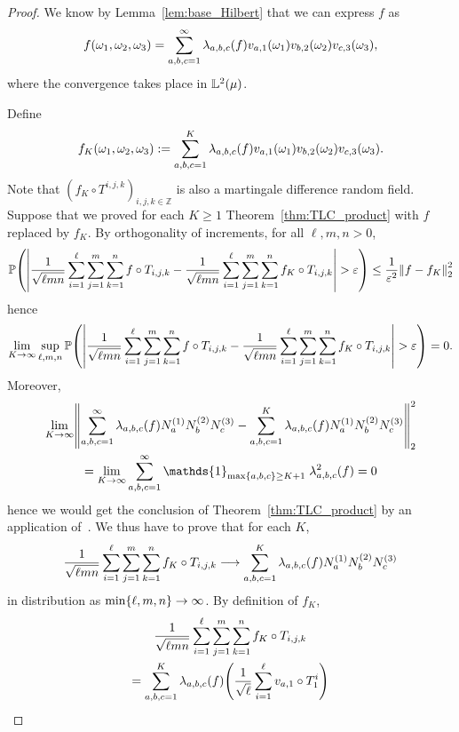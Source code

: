 \documentclass[AHL,Unicode,longabstracts,published]{cedram}
\newcommand{\Z}{\mathbb{Z}}
\newcommand*\bbL{\mathbb{L}}
\newcommand{\PP}{\mathbb{P}}
\newcommand{\pr}[1]{\left(#1\right)}
\newcommand{\norm}[1]{\left\lVert #1\right\rVert}
\newcommand{\abs}[1]{\left\lvert #1\right\rvert}
\newcommand{\ens}[1]{\left\{#1\right\}}
\renewcommand*{\to}{\mathchoice{\longrightarrow}{\rightarrow}{\rightarrow}{\rightarrow}}
\let\originalleft\left
\let\originalright\right
\renewcommand{\left}{\mathopen{}\mathclose\bgroup\originalleft}
\renewcommand{\right}{\aftergroup\egroup\originalright}
\begin{document}
\begin{proof}
We know by Lemma~\ref{lem:base_Hilbert} that we can express $f$ as
\[
f(\omega_1,\omega_2,\omega_3)=\sum_{a,b,c=1}^\infty
\lambda_{a,b,c}\pr{f}
v_{a,1}\pr{\omega_1}v_{b,2}\pr{\omega_2}v_{c,3}\pr{\omega_3},
\]
where the convergence takes place in $\bbL^2\pr{\mu}$.

Define
\begin{equation*}
f_K\pr{\omega_1,\omega_2,\omega_3}:=\sum_{a,b,c=1}^K
\lambda_{a,b,c}\pr{f} v_{a,1}\pr{\omega_1}v_{b,2}\pr{\omega_2}v_{c,3}\pr{\omega_3}.
\end{equation*}
Note that $(f_K\circ T^{i,j,k})_{i,j,k\in\Z}$ is also a martingale difference random field. Suppose that we proved for each $K\geq 1$ Theorem~\ref{thm:TLC_product} with $f$ replaced by $f_K$. By orthogonality of increments, for all $\ell, m, n>0$,
\[
\PP\pr{\abs{\frac1{\sqrt{\ell mn}}\sum_{i=1}^\ell\sum_{j=1}^m\sum_{k=1}^n f\circ T_{i,j,k}-\frac1{\sqrt{\ell mn}}\sum_{i=1}^\ell\sum_{j=1}^m\sum_{k=1}^n f_K\circ T_{i,j,k}}>\varepsilon}
\leq\frac 1{\varepsilon^2}\norm{f-f_K}_2^2
\]
hence
\[
\lim_{K\to\infty}\sup_{\ell,m,n}
\PP\pr{\abs{\frac1{\sqrt{\ell mn}}\sum_{i=1}^\ell\sum_{j=1}^m\sum_{k=1}^n f\circ T_{i,j,k}-\frac1{\sqrt{\ell mn}}\sum_{i=1}^\ell\sum_{j=1}^m\sum_{k=1}^n f_K\circ T_{i,j,k}}>\varepsilon}=0.
\]
Moreover,
\begin{multline*}
\lim_{K\to\infty}\norm{\sum_{a,b,c=1}^\infty \lambda_{a,b,c}\pr{f} N_a^{\pr{1}}N_b^{\pr{2}}N_c^{\pr{3}}-\sum_{a,b,c=1}^K
\lambda_{a,b,c}\pr{f} N_a^{\pr{1}}N_b^{\pr{2}}N_c^{\pr{3}}}_2^2\\ =
\lim_{K\to\infty} \sum_{a,b,c=1}^\infty
\mathds{1}_{\max\ens{a,b,c}\geq K+1 }\;
\lambda_{a,b,c}^2\pr{f}=0
\end{multline*}
hence we would get the conclusion of Theorem~\ref{thm:TLC_product} by an application of~\cite[Theorem~4.2]{MR233396}. We thus have to prove that for each $K$,
\begin{equation}\label{eq:tlc_produit_somme_de_K_elements}
\frac1{\sqrt{\ell mn}}\sum_{i=1}^\ell\sum_{j=1}^m\sum_{k=1}^n f_K\circ T_{i,j,k}\to \sum_{a,b,c=1}^K\lambda_{a,b,c}\pr{f} N_a^{\pr{1}}N_b^{\pr{2}}N_c^{\pr{3}}
\end{equation}
in distribution as $\min\{\ell,m,n\}\to\infty$. By definition of $f_K$,
\begin{multline*}
\frac1{\sqrt{\ell mn}}\sum_{i=1}^\ell\sum_{j=1}^m\sum_{k=1}^n f_K\circ T_{i,j,k}\\
=\sum_{a,b,c=1}^K\lambda_{a,b,c}\pr{f}
\pr{\frac 1{\sqrt{\ell}}\sum_{i=1}^\ell v_{a,1}\circ T_1^i}

\end{multline*}
\end{proof}
\end{document}
